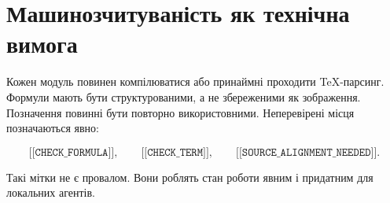 \section{Машинозчитуваність як технічна вимога}

Кожен модуль повинен компілюватися або принаймні проходити TeX-парсинг. Формули мають бути структурованими, а не збереженими як зображення. Позначення повинні бути повторно використовними. Неперевірені місця позначаються явно:

\[
\texttt{[[CHECK\_FORMULA]]},\qquad
\texttt{[[CHECK\_TERM]]},\qquad
\texttt{[[SOURCE\_ALIGNMENT\_NEEDED]]}.
\]

Такі мітки не є провалом. Вони роблять стан роботи явним і придатним для локальних агентів.
